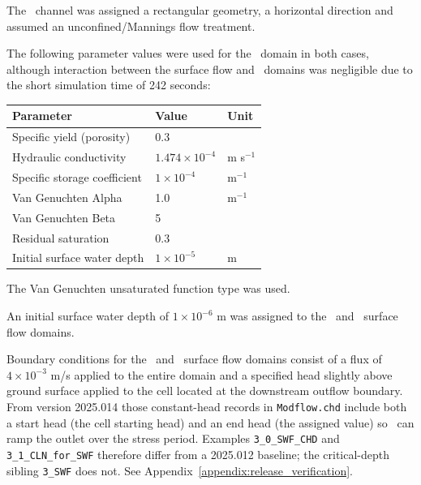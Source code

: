The \cln\ channel was assigned a rectangular geometry, a horizontal direction and assumed an unconfined/Mannings flow treatment.

The following parameter values were used for the \gwf\ domain in both cases, although interaction between the surface flow and \gwf\ domains was negligible due to the short simulation time of 242 seconds:

\begin{center}
    \begin{tabular}{lll}  \hline
        Parameter                     & Value & Unit                                \\ \hline
        Specific yield (porosity)     &  0.3                        &               \\
        Hydraulic conductivity        &  $ 1.474 \times 10^{-4}$    &   m s$^{-1}$  \\
        Specific storage coefficient  &  $ 1 \times 10^{-4}$        &   m$^{-1}$    \\
        Van Genuchten Alpha           &  1.0                        &   m$^{-1}$    \\
        Van Genuchten Beta            &  5                          &               \\
        Residual saturation           &  0.3                        &               \\
        Initial surface water depth   &  $1 \times 10^{-5}$         &   m           \\
    \hline
    \end{tabular}
\end{center}

The Van Genuchten unsaturated function type was used.

An initial surface water depth of $1 \times 10^{-6}$ m was assigned to the \swf\ and \cln\ surface flow domains.

Boundary conditions for the \swf\ and \cln\ surface flow domains consist of a flux of $4 \times 10^{-3}$ m/s applied to the entire domain and a specified head slightly above ground surface applied to the cell located at the downstream outflow boundary.
From version 2025.014 those constant-head records in \texttt{Modflow.chd} include both a start head (the cell starting head) and an end head (the assigned value) so \mfus\ can ramp the outlet over the stress period.
Examples \texttt{3\_0\_SWF\_CHD} and \texttt{3\_1\_CLN\_for\_SWF} therefore differ from a 2025.012 baseline; the critical-depth sibling \texttt{3\_SWF} does not.
See Appendix~\ref{appendix:release_verification}.

